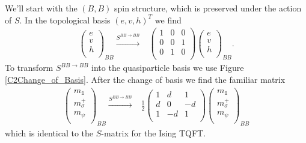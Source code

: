 \documentclass[12pt,a4paper]{article}
\newcounter{arrow}
\newcommand{\unit}{\mathds{1}}
\begin{document}
We'll start with the $(B,B)$ spin structure, which is preserved under the action of $S$. 
In the topological basis $(e,v,h)^T$ we find
\begin{align}
\left( \begin{matrix}
e\\
v\\
h\\
\end{matrix} \right)_{BB} 
\xrightarrow{S^{BB \rightarrow BB}} & \left( \begin{matrix}
1&0&0\\
0&0&1\\
0&1&0\\
\end{matrix} \right)
\left( \begin{matrix}
e\\
v\\
h\\
\end{matrix} \right)_{BB}.
\end{align}
To transform $S^{BB\rightarrow BB}$ into the quasiparticle basis we use Figure \ref{C2Change_of_Basis}.
After the change of basis we find the familiar matrix
\begin{align}
\left( \begin{matrix}
m_\unit\\
m_\sigma^+\\
m_\psi \\
\end{matrix} \right)_{BB} 
\xrightarrow{S^{BB \rightarrow BB}} &\frac{1}{2} \left( \begin{matrix}
1&d&1\\
d&0&-d\\
1&-d&1\\
\end{matrix} \right)
\left( \begin{matrix}
m_\unit\\
m_\sigma^+\\
m_\psi \\
\end{matrix} \right)_{BB}
\end{align}
which is identical to the $S$-matrix for the Ising TQFT. 
\end{document}
